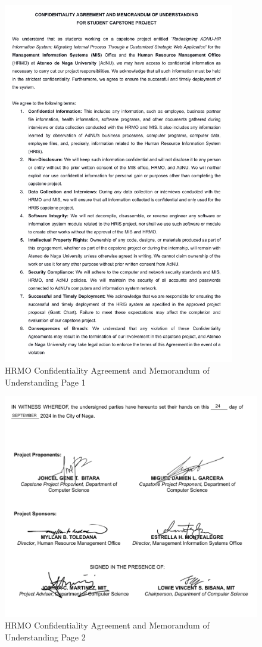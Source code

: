 \begin{figure}[H]
    \centering
    \includegraphics[width=0.9\textwidth]{figures/images/nda/hr-nda-1.png}
    \caption{HRMO Confidentiality Agreement and Memorandum of Understanding Page 1}
    \label{fig:hr-nda-1}
\end{figure}

\begin{figure}[H]
    \centering
    \includegraphics[width=1\textwidth]{figures/images/nda/hr-nda-2.png}
    \caption{HRMO Confidentiality Agreement and Memorandum of Understanding Page 2}
    \label{fig:hr-nda-2}
\end{figure}